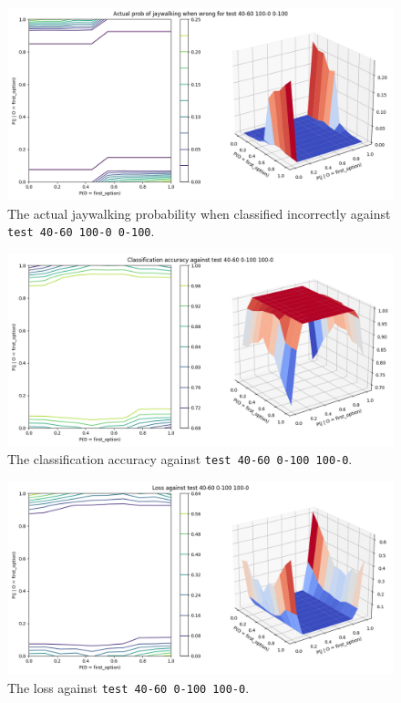 \documentclass{report}
\newcommand{\code}{\texttt}
\begin{document}
\begin{figure}[h]
    \centering
    \includegraphics[width=\textwidth]{test_40-60_100-0_0-100_jay_prob.png}
    \caption[]{The actual jaywalking probability when classified incorrectly against \code{test 40-60 100-0 0-100}.}
    \label{fig:test_40-60_100-0_0-100_jay_prob_plot}
\end{figure}

% 
% 

\begin{figure}[h]
    \centering
    \includegraphics[width=\textwidth]{test_40-60_0-100_100-0_accuracy.png}
    \caption[]{The classification accuracy against \code{test 40-60 0-100 100-0}.}
    \label{fig:test_40-60_0-100_100-0_accuracy_plot}
\end{figure}

\begin{figure}[h]
    \centering
    \includegraphics[width=\textwidth]{test_40-60_0-100_100-0_loss.png}
    \caption[]{The loss against \code{test 40-60 0-100 100-0}.}
    \label{fig:test_40-60_0-100_100-0_loss_plot}
\end{figure}
\end{document}
